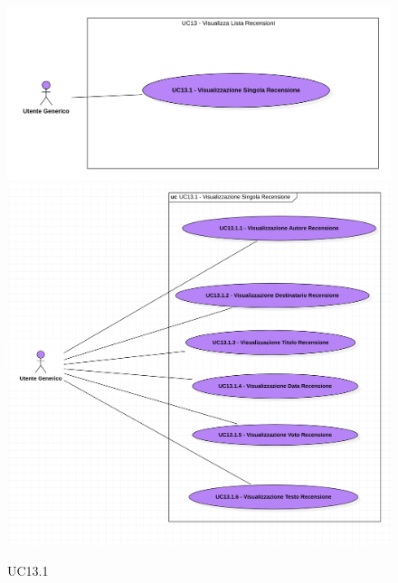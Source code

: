             \begin{figure}[H]
                \centering
                \includegraphics[scale=0.6]{src/img/UC13.1.png}
                \includegraphics[scale=0.4]{src/img/UC13.1.x.png}
                \caption{UC13.1}
            \end{figure}

